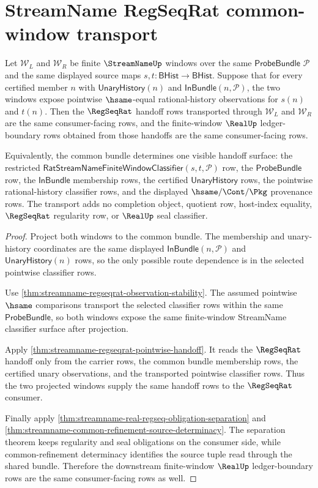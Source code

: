 \section{StreamName RegSeqRat common-window transport}
\label{sec:streamname-regseqrat-common-window-transport}

\begin{theorem}
\label{thm:streamname-regseqrat-common-window-transport}
Let $\mathcal W_L$ and $\mathcal W_R$ be finite $\StreamNameUp$ windows over
the same $\mathsf{ProbeBundle}$ $\mathcal P$ and the same displayed source
maps $s,t:\mathsf{BHist}\to\mathsf{BHist}$. Suppose that for every certified
member $n$ with $\mathsf{UnaryHistory}(n)$ and
$\mathsf{InBundle}(n,\mathcal P)$, the two windows expose pointwise
$\hsame$-equal rational-history observations for $s(n)$ and $t(n)$. Then the
$\RegSeqRat$ handoff rows transported through $\mathcal W_L$ and
$\mathcal W_R$ are the same consumer-facing rows, and the finite-window
$\RealUp$ ledger-boundary rows obtained from those handoffs are the same
consumer-facing rows.

Equivalently, the common bundle determines one visible handoff surface: the
restricted $\mathsf{RatStreamNameFiniteWindowClassifier}(s,t,\mathcal P)$
row, the $\mathsf{ProbeBundle}$ row, the $\mathsf{InBundle}$ membership rows,
the certified $\mathsf{UnaryHistory}$ rows, the pointwise rational-history
classifier rows, and the displayed $\hsame/\Cont/\Pkg$ provenance rows. The
transport adds no completion object, quotient row, host-index equality,
$\RegSeqRat$ regularity row, or $\RealUp$ seal classifier.
\end{theorem}
\begin{proof}
Project both windows to the common bundle. The membership and unary-history
coordinates are the same displayed $\mathsf{InBundle}(n,\mathcal P)$ and
$\mathsf{UnaryHistory}(n)$ rows, so the only possible route dependence is in
the selected pointwise classifier rows.

Use \autoref{thm:streamname-regseqrat-observation-stability}. The assumed
pointwise $\hsame$ comparisons transport the selected classifier rows within
the same $\mathsf{ProbeBundle}$, so both windows expose the same finite-window
StreamName classifier surface after projection.

Apply \autoref{thm:streamname-regseqrat-pointwise-handoff}. It reads the
$\RegSeqRat$ handoff only from the carrier rows, the common bundle membership
rows, the certified unary observations, and the transported pointwise
classifier rows. Thus the two projected windows supply the same handoff rows
to the $\RegSeqRat$ consumer.

Finally apply \autoref{thm:streamname-real-regseq-obligation-separation} and
\autoref{thm:streamname-common-refinement-source-determinacy}. The separation
theorem keeps regularity and seal obligations on the consumer side, while
common-refinement determinacy identifies the source tuple read through the
shared bundle. Therefore the downstream finite-window $\RealUp$
ledger-boundary rows are the same consumer-facing rows as well.
\end{proof}

